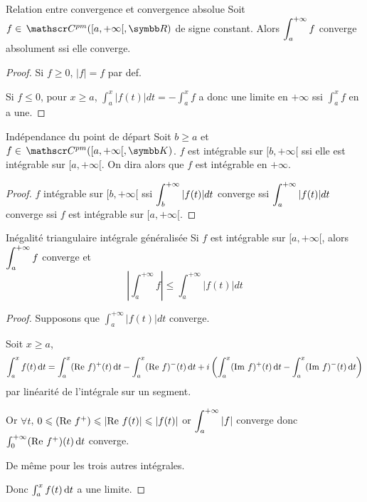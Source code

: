 \begin{proposition}{Relation entre convergence et convergence absolue}{}
    Soit $f \in \mc{pm}([a, + \infty[, \R)$ de signe constant. Alors 
    $\displaystyle \int_a^{+ \infty} f$ converge absolument ssi elle converge. 
\end{proposition}

\begin{proof}
    Si $f \geqslant 0$, $|f| = f$ par def. 

    Si $f \leqslant 0$, pour $x \geqslant a$, $\int_a^x |f(t)| dt = - \int_a^x f$ a donc une 
    limite en $+ \infty$ ssi $\int_a^x f$ en a une.
\end{proof}

\begin{proposition}{Indépendance du point de départ}{}
    Soit $b \geqslant a$ et $f \in \mc{pm}([a, + \infty[, \K)$. 
    $f$ est intégrable sur $[b, + \infty[$ ssi elle est intégrable sur $[a, + \infty[$.
    On dira alors que $f$ est intégrable en $+ \infty$.
\end{proposition}

\begin{proof}
    $f$ intégrable sur $[b, + \infty[$ ssi $\displaystyle \int_b^{+ \infty} |f(t)| dt$ converge
    ssi $\displaystyle \int_a^{+ \infty} |f(t)| dt $ converge ssi $f$ est intégrable sur $[a, + \infty[$.
\end{proof}

\begin{theoreme}{Inégalité triangulaire intégrale généralisée}{}
    Si $f$ est intégrable sur $[a, + \infty[$, alors $\displaystyle \int_a^{+ \infty} f$ converge et 
    $$\left| \int_{a }^{+\infty} f \right| \leqslant \int_{a }^{+\infty} |f(t)| dt $$
\end{theoreme}


\begin{proof}
    Supposons que $\int_a^{+ \infty} |f(t)| dt$ converge.

    Soit $x \geqslant a$,
    $$\int_a^x f(t) \,\mathrm{d}t = \int_a^x (\operatorname{Re} \, f)^+(t) \,\mathrm{d}t - \int_a^x (\operatorname{Re} \, f)^-(t) \,\mathrm{d}t + i \left( \int_a^x (\operatorname{Im} \, f)^+(t) \,\mathrm{d}t - \int_a^x (\operatorname{Im} \, f)^-(t) \,\mathrm{d}t \right)$$
    par linéarité de l'intégrale sur un segment.

    Or $\forall t$, $0 \leqslant (\operatorname{Re} \, f^+) \leqslant \left| \operatorname{Re} \, f(t) \right| \leqslant |f(t)|$ or 
    $\displaystyle \int_{a }^{+ \infty   } |f| $ converge donc $\int_0^{+ \infty} (\operatorname{Re} \, f^+)(t) \,\mathrm{d}t$ converge. 

    De même pour les trois autres intégrales.

    Donc $\int_a^x f(t) \,\mathrm{d}t$ a une limite. 
\end{proof}

